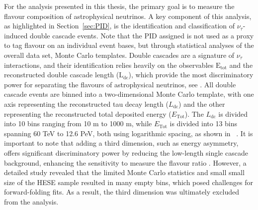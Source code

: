 For the analysis presented in this thesis, the primary goal is to measure the flavour composition of astrophysical neutrinos. A key component of this analysis, as highlighted in Section~\ref{sec:PID}, is the identification and classification of $\nu_\tau$-induced double cascade events. Note that the PID assigned is not used as a proxy to tag flavour on an individual event bases, but through statistical analyses of the overall data set, Monte Carlo templates. Double cascades are a signature of $\nu_\tau$ interactions, and their identification relies heavily on the observables $\mathrm{E}_\mathrm{tot}$ and the reconstructed double cascade length ($\mathrm{L}_{\text{dc}}$), which provide the most discriminatory power for separating the flavours of astrophysical neutrinos, see . All double cascade events are binned into a two-dimensional Monte Carlo template, with one axis representing the reconstructed tau decay length ($L_{\text{dc}}$) and the other representing the reconstructed total deposited energy ($E_{\text{Tot}}$). The $L_{\text{dc}}$ is divided into 10 bins ranging from 10 m to 1000 m, while $E_{\text{Tot}}$ is divided into 13 bins spanning 60 TeV to 12.6 PeV, both using logarithmic spacing, as shown in ~. It is important to note that adding a third dimension, such as energy asymmetry, offers significant discriminatory power by reducing the low-length single cascade background, enhancing the sensitivity to measure the flavour ratio . However, a detailed study revealed that the limited Monte Carlo statistics and small small size of the HESE sample resulted in many empty bins, which posed challenges for forward-folding fits. As a result, the third dimension was ultimately excluded from the analysis.


